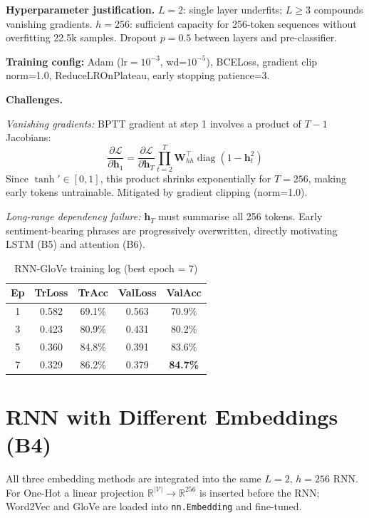 \documentclass[10pt,a4paper,twocolumn]{article}
\begin{document}
\textbf{Hyperparameter justification.}
$L=2$: single layer underfits; $L\ge3$ compounds vanishing gradients.
$h=256$: sufficient capacity for 256-token sequences without overfitting 22.5k samples.
Dropout $p=0.5$ between layers and pre-classifier.

\textbf{Training config:} Adam ($\text{lr}=10^{-3}$, wd=$10^{-5}$),
BCELoss, gradient clip norm=1.0, ReduceLROnPlateau, early stopping patience=3.

\textbf{Challenges.}

\textit{Vanishing gradients:} BPTT gradient at step 1 involves a product of
$T{-}1$ Jacobians:
\begin{equation}
  \frac{\partial\mathcal{L}}{\partial\mathbf{h}_1}
  \!=\!\frac{\partial\mathcal{L}}{\partial\mathbf{h}_T}
  \prod_{t=2}^{T}\!\mathbf{W}_{hh}^\top\operatorname{diag}(1\!-\!\mathbf{h}_t^2)
\end{equation}
Since $\tanh'\!\in\![0,1]$, this product shrinks exponentially for $T=256$,
making early tokens untrainable. Mitigated by gradient clipping (norm=1.0).

\textit{Long-range dependency failure:} $\mathbf{h}_T$ must summarise all
256 tokens. Early sentiment-bearing phrases are progressively overwritten,
directly motivating LSTM (B5) and attention (B6).

\begin{table}[H]
\centering\small
\caption{RNN-GloVe training log (best epoch = 7)}
\begin{tabular}{ccccc}
\toprule
Ep & TrLoss & TrAcc & ValLoss & ValAcc\\
\midrule
1 & 0.582 & 69.1\% & 0.563 & 70.9\%\\
3 & 0.423 & 80.9\% & 0.431 & 80.2\%\\
5 & 0.360 & 84.8\% & 0.391 & 83.6\%\\
\rowcolor{lightblue}
7 & 0.329 & 86.2\% & 0.379 & \textbf{84.7\%}\\
\bottomrule
\end{tabular}
\label{tab:rnn_log}
\end{table}

\section{RNN with Different Embeddings (B4)}

All three embedding methods are integrated into the same $L=2$, $h=256$
RNN. For One-Hot a linear projection $\mathbb{R}^{|\mathcal{V}|}\to\mathbb{R}^{256}$
is inserted before the RNN; Word2Vec and GloVe are loaded into
\texttt{nn.Embedding} and fine-tuned.
\end{document}
